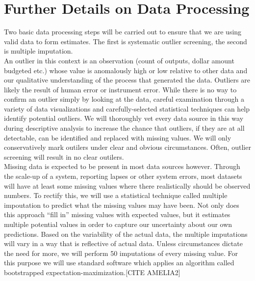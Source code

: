 \documentclass[twocolumn]{bmcart}%
\begin{document}
\section{Further Details on Data Processing} \label{data_processing}

Two basic data processing steps will be carried out to ensure that we are using valid data to form estimates. The first is systematic outlier screening, the second is multiple imputation. \\

An outlier in this context is an observation (count of outputs, dollar amount budgeted etc.) whose value is anomalously high or low relative to other data and our qualitative understanding of the process that generated the data. Outliers are likely the result of human error or instrument error. While there is no way to confirm an outlier simply by looking at the data, careful examination through a variety of data visualizations and carefully-selected statistical techniques can help identify potential outliers. We will thoroughly vet every data source in this way during descriptive analysis to increase the chance that outliers, if they are at all detectable, can be identified and replaced with missing values. We will only conservatively mark outilers under clear and obvious circumstances. Often, outlier screening will result in no clear outilers. \\

Missing data is expected to be present in most data sources however. Through the scale-up of a system, reporting lapses or other system errors, most datasets will have at least some missing values where there realistically should be observed numbers. To rectify this, we will use a statistical technique called multiple impoutation to predict what the missing values may have been. Not only does this approach ``fill in'' missing values with expected values, but it estimates multiple potential values in order to capture our uncertainty about our own predictions. Based on the variability of the actual data, the multiple imputations will vary in a way that is reflective of actual data. Unless circumstances dictate the need for more, we will perform 50 imputations of every missing value. For this purpose we will use standard software which applies an algorithm called bootstrapped expectation-maximization.[CITE AMELIA2]

\end{document}
